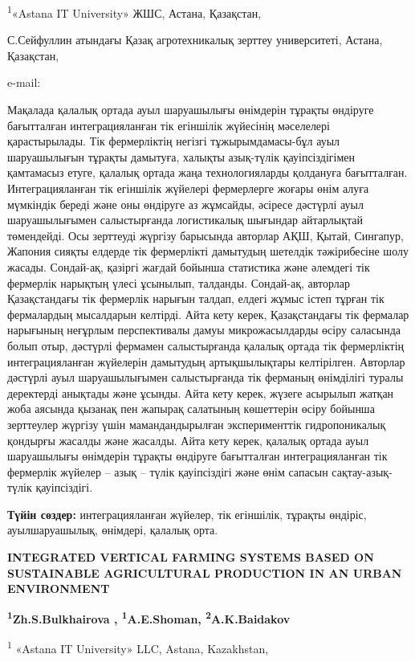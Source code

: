 \textsuperscript{1}«Astana IT University» ЖШС, Астана, Қазақстан,

С.Сейфуллин атындағы Қазақ агротехникалық зерттеу университеті, Астана,
Қазақстан,

e-mail: \href{mailto:honeyzhu@mail.ru}{}

Мақалада қалалық ортада ауыл шаруашылығы өнімдерін тұрақты өндіруге
бағытталған интеграцияланған тік егіншілік жүйесінің мәселелері
қарастырылады. Тік фермерліктің негізгі тұжырымдамасы-бұл ауыл
шаруашылығын тұрақты дамытуға, халықты азық-түлік қауіпсіздігімен
қамтамасыз етуге, қалалық ортада жаңа технологияларды қолдануға
бағытталған. Интеграцияланған тік егіншілік жүйелері фермерлерге жоғары
өнім алуға мүмкіндік береді және оны өндіруге аз жұмсайды, әсіресе
дәстүрлі ауыл шаруашылығымен салыстырғанда логистикалық шығындар
айтарлықтай төмендейді. Осы зерттеуді жүргізу барысында авторлар АҚШ,
Қытай, Сингапур, Жапония сияқты елдерде тік фермерлікті дамытудың
шетелдік тәжірибесіне шолу жасады. Сондай-ақ, қазіргі жағдай бойынша
статистика және әлемдегі тік фермерлік нарықтың үлесі ұсынылып,
талданды. Сондай-ақ, авторлар Қазақстандағы тік фермерлік нарығын
талдап, елдегі жұмыс істеп тұрған тік фермалардың мысалдарын келтірді.
Айта кету керек, Қазақстандағы тік фермалар нарығының неғұрлым
перспективалы дамуы микрожасылдарды өсіру саласында болып отыр, дәстүрлі
фермамен салыстырғанда қалалық ортада тік фермерліктің интеграцияланған
жүйелерін дамытудың артықшылықтары келтірілген. Авторлар дәстүрлі ауыл
шаруашылығымен салыстырғанда тік ферманың өнімділігі туралы деректерді
анықтады және ұсынды. Айта кету керек, жүзеге асырылып жатқан жоба
аясында қызанақ пен жапырақ салатының көшеттерін өсіру бойынша
зерттеулер жүргізу үшін мамандандырылған эксперименттік гидропоникалық
қондырғы жасалды және жасалды. Айта кету керек, қалалық ортада ауыл
шаруашылығы өнімдерін тұрақты өндіруге бағытталған интеграцияланған тік
фермерлік жүйелер -- азық -- түлік қауіпсіздігі және өнім сапасын
сақтау-азық-түлік қауіпсіздігі.

{\bfseries Түйін сөздер:} интеграцияланған жүйелер, тік егіншілік, тұрақты
өндіріс, ауылшаруашылық, өнімдері, қалалық орта.

{\bfseries INTEGRATED VERTICAL FARMING SYSTEMS BASED ON SUSTAINABLE
AGRICULTURAL PRODUCTION IN AN URBAN ENVIRONMENT}

{\bfseries \textsuperscript{1}Zh.S.Bulkhairova\textsuperscript{\envelope } ,
\textsuperscript{1}A.E.Shoman, \textsuperscript{2}A.K.Baidakov}

\textsuperscript{1} «Astana IT University» LLC, Astana, Kazakhstan,

